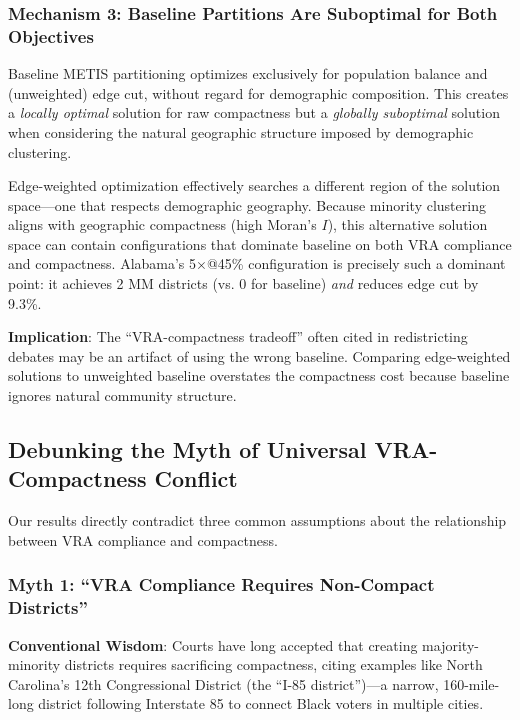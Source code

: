 \subsubsection{Mechanism 3: Baseline Partitions Are Suboptimal for Both Objectives}

Baseline METIS partitioning optimizes exclusively for population balance and (unweighted) edge cut, without regard for demographic composition. This creates a \emph{locally optimal} solution for raw compactness but a \emph{globally suboptimal} solution when considering the natural geographic structure imposed by demographic clustering.

Edge-weighted optimization effectively searches a different region of the solution space---one that respects demographic geography. Because minority clustering aligns with geographic compactness (high Moran's $I$), this alternative solution space can contain configurations that dominate baseline on both VRA compliance and compactness. Alabama's 5$\times$@45\% configuration is precisely such a dominant point: it achieves 2 MM districts (vs. 0 for baseline) \emph{and} reduces edge cut by 9.3\%.

\textbf{Implication}: The ``VRA-compactness tradeoff'' often cited in redistricting debates may be an artifact of using the wrong baseline. Comparing edge-weighted solutions to unweighted baseline overstates the compactness cost because baseline ignores natural community structure.

\subsection{Debunking the Myth of Universal VRA-Compactness Conflict}

Our results directly contradict three common assumptions about the relationship between VRA compliance and compactness.

\subsubsection{Myth 1: ``VRA Compliance Requires Non-Compact Districts''}

\textbf{Conventional Wisdom}: Courts have long accepted that creating majority-minority districts requires sacrificing compactness, citing examples like North Carolina's 12th Congressional District (the ``I-85 district'')---a narrow, 160-mile-long district following Interstate 85 to connect Black voters in multiple cities.

